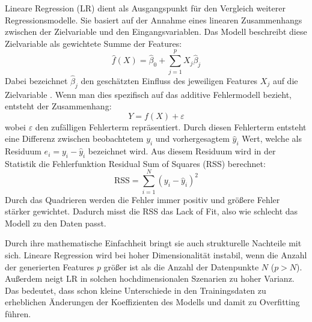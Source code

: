 Lineare Regression (LR) dient als Ausgangspunkt für den Vergleich weiterer Regressionsmodelle. Sie basiert auf der Annahme eines linearen Zusammenhangs zwischen der Zielvariable und den Eingangsvariablen. Das Modell beschreibt diese Zielvariable als gewichtete Summe der Features:
\begin{equation}
  \hat{f}(X) = \hat{\beta}_0 + \sum_{j=1}^{p}X_j\hat{\beta}_j
\end{equation}
Dabei bezeichnet $\hat{\beta}_j$ den geschätzten Einfluss des jeweiligen Features $X_j$ auf die Zielvariable \cite[S.~11,44]{tesl}. Wenn man dies spezifisch auf das additive Fehlermodell bezieht, entsteht der Zusammenhang:
\begin{equation}
  Y = f(X) + \varepsilon
\end{equation}
wobei $\varepsilon$ den zufälligen Fehlerterm repräsentiert. \cite[S.~28]{tesl} Durch diesen Fehlerterm entsteht eine Differenz zwischen beobachtetem $y_i$ und vorhergesagtem $\hat{y}_i$ Wert, welche als Residuum $e_i=y_i-\hat{y}_i$ bezeichnet wird. Aus diesem Residuum wird in der Statistik die Fehlerfunktion Residual Sum of Squares (RSS) berechnet:
\begin{equation} \label{rss}
  \text{RSS} = \sum_{i=1}^{N} (y_i - \hat{y}_i)^2
\end{equation}
Durch das Quadrieren werden die Fehler immer positiv und größere Fehler stärker gewichtet. Dadurch misst die RSS das \glqq Lack of Fit\grqq{}, also wie schlecht das Modell zu den Daten passt. \cite[S.~12]{tesl}

Durch ihre mathematische Einfachheit bringt sie auch strukturelle Nachteile mit sich. Lineare Regression wird bei hoher Dimensionalität instabil, wenn die Anzahl der generierten Features $p$ größer ist als die Anzahl der Datenpunkte $N$ ($p>N$). Außerdem neigt LR in solchen hochdimensionalen Szenarien zu hoher Varianz. Das bedeutet, dass schon kleine Unterschiede in den Trainingsdaten zu erheblichen Änderungen der Koeffizienten des Modells und damit zu Overfitting führen. \cite[S.~47,649]{tesl}

